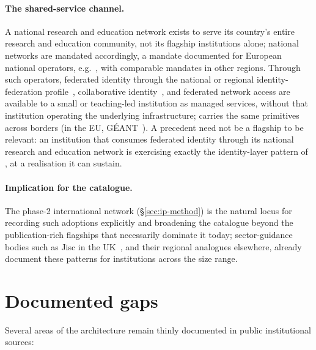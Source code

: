 \paragraph{The shared-service channel.} A national
research and education network exists to serve its country's entire
research and education community, not its flagship institutions alone;
national networks are mandated accordingly, a mandate documented for
European national operators, e.g.~\cite{restena,dfn,switch-nren},
with comparable mandates in other regions. Through such
operators, federated identity through the national or regional
identity-federation profile~\cite{edugain}, collaborative
identity~\cite{eduteams}, and federated network access are available
to a small or teaching-led institution as managed services, without
that institution operating the underlying infrastructure;
 carries the same primitives across
borders (in the EU, GÉANT~\cite{geant}). A precedent need not be a flagship to be
relevant: an institution that consumes federated identity through its
national research and education network is exercising exactly the
identity-layer pattern of , at a
realisation it can sustain.

\paragraph{Implication for the catalogue.} The phase-2 international
network (\S\ref{sec:ip-method}) is the natural locus for recording
such adoptions explicitly and broadening the catalogue beyond the
publication-rich flagships that necessarily dominate it today;
sector-guidance bodies such as Jisc in the UK~\cite{jisc-guidance},
and their regional analogues elsewhere, already document these patterns
for institutions across the size range.

\section{Documented gaps}
\label{sec:ip-gaps}

Several areas of the architecture remain thinly documented in
public institutional sources:

